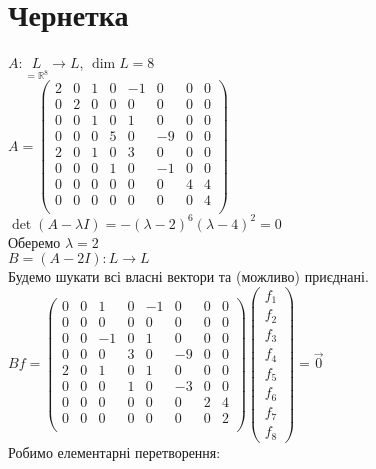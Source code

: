 \documentclass[a4paper, 10pt]{article}
\theoremstyle{theoremdd}
\begin{document}
\section*{Чернетка}
$A: \underset{= \mathbb{R}^8}{L} \to L$, $\dim L = 8$\\
$A = \begin{pmatrix}
2 & 0 & 1 & 0 & -1 & 0 & 0 & 0 \\
0 & 2 & 0 & 0 & 0 & 0 & 0 & 0 \\
0 & 0 & 1 & 0 & 1 & 0 & 0 & 0 \\
0 & 0 & 0 & 5 & 0 & -9 & 0 & 0 \\
2 & 0 & 1 & 0 & 3 & 0 & 0 & 0 \\
0 & 0 & 0 & 1 & 0 & -1 & 0 & 0 \\
0 & 0 & 0 & 0 & 0 & 0 & 4 & 4 \\
0 & 0 & 0 & 0 & 0 & 0 & 0 & 4 \\
\end{pmatrix}$\\
$\det (A - \lambda I) = -(\lambda - 2)^6 (\lambda - 4)^2 = 0$\\
Оберемо $\lambda = 2$\\
$B = (A - 2I): L \to L$\\
Будемо шукати всі власні вектори та (можливо) приєднані.\\
$Bf = \begin{pmatrix}
0 & 0 & 1 & 0 & -1 & 0 & 0 & 0 \\
0 & 0 & 0 & 0 & 0 & 0 & 0 & 0 \\
0 & 0 & -1 & 0 & 1 & 0 & 0 & 0 \\
0 & 0 & 0 & 3 & 0 & -9 & 0 & 0 \\
2 & 0 & 1 & 0 & 1 & 0 & 0 & 0 \\
0 & 0 & 0 & 1 & 0 & -3 & 0 & 0 \\
0 & 0 & 0 & 0 & 0 & 0 & 2 & 4 \\
0 & 0 & 0 & 0 & 0 & 0 & 0 & 2 \\
\end{pmatrix} \begin{pmatrix}
f_1 \\ f_2 \\ f_3 \\ f_4 \\ f_5 \\ f_6 \\ f_7 \\ f_8
\end{pmatrix} = \vec{0}$\\
Робимо елементарні перетворення:\\
\end{document}
